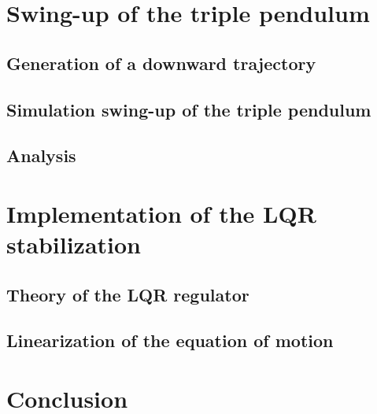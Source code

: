 \documentclass[a4paper,12pt,twoside]{article}
\begin{document}
\section{Swing-up of the triple pendulum}

\subsection{Generation of a downward trajectory}

\subsection{Simulation swing-up of the triple pendulum}

\subsection{Analysis}

\section{Implementation of the LQR stabilization}
\subsection{Theory of the LQR regulator}

\subsection{Linearization of the equation of motion}
\section{Conclusion}
\end{document}
